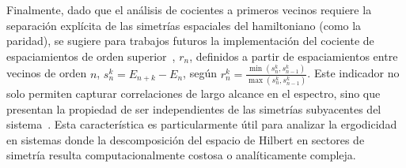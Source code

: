 \documentclass[10pt,a4paper]{article}
\begin{document}
Finalmente, dado que el análisis de cocientes a primeros vecinos requiere la separación explícita de las simetrías espaciales del hamiltoniano (como la paridad), se sugiere para trabajos futuros la implementación del cociente de espaciamientos de orden superior~\cite{Tekur2020},
$r_n$, definidos a partir de espaciamientos entre vecinos de orden $n$, $s^{k}_n=E_{n+k}-E_{n}$, según $r^{k}_n = \frac{\min(s^{k}_n, s^{k}_{n-1})}{\max(s^{k}_n, s^{k}_{n-1})}$. Este indicador no solo permiten capturar correlaciones de largo alcance en el espectro, sino que presentan la propiedad de ser independientes de las simetrías subyacentes del sistema~\cite{Tekur2020}. Esta característica es particularmente útil para analizar la ergodicidad en sistemas donde la descomposición del espacio de Hilbert en sectores de simetría resulta computacionalmente costosa o analíticamente compleja.

\printbibliography
\end{document}
